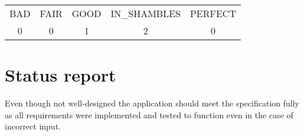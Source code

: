 \begin{tabular}{c|c|c|c|c}
BAD & FAIR & GOOD & IN\_SHAMBLES & PERFECT \\ 
0 & 0 & 1 & 2 & 0 \\ 
\end{tabular}

\section{Status report}
\label{sec:status_report}

Even though not well-designed the application should meet the specification fully as all requirements were implemented and tested to function even in the case of incorrect input.
